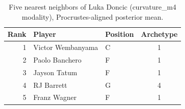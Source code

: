 \begin{table}[htbp]
  \centering\small
  \begin{tabular}{rllc}
    \toprule
    Rank & Player & Position & Archetype \\
    \midrule
    1 & Victor Wembanyama & C & 1 \\
    2 & Paolo Banchero & F & 1 \\
    3 & Jayson Tatum & F & 1 \\
    4 & RJ Barrett & G & 4 \\
    5 & Franz Wagner & F & 1 \\
    \bottomrule
  \end{tabular}
  \caption{Five nearest neighbors of Luka Doncic (curvature_m4 modality), Procrustes-aligned posterior mean.}
  \label{tab:Luka_Doncic_neighbors_curvature_m4}
\end{table}

